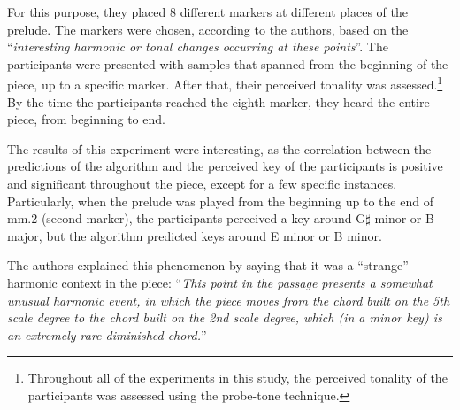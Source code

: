 For this purpose, they placed 8 different markers at different places of the prelude. The markers were chosen, according to the authors, based on the ``\emph{interesting harmonic or tonal changes occurring at these points}''. The participants were presented with samples that spanned from the beginning of the piece, up to a specific marker. After that, their perceived tonality was assessed.\footnote{Throughout all of the experiments in this study, the perceived tonality of the participants was assessed using the probe-tone technique.} By the time the participants reached the eighth marker, they heard the entire piece, from beginning to end.

The results of this experiment were interesting, as the correlation between the predictions of the algorithm and the perceived key of the participants is positive and significant throughout the piece, except for a few specific instances. Particularly, when the prelude was played from the beginning up to the end of mm.2 (second marker), the participants perceived a key around G$\sharp$ minor or B major, but the algorithm predicted keys around E minor or B minor.

The authors explained this phenomenon by saying that it was a ``strange'' harmonic context in the piece: ``\emph{This point in the passage presents a somewhat unusual harmonic event, in which the piece moves from the chord built on the 5th scale degree to the chord built on the 2nd scale degree, which (in a minor key) is an extremely rare diminished chord.}''









